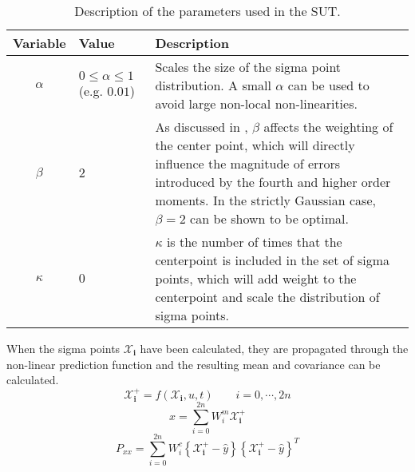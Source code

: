     \begin{table}
        \begin{tabularx}{\tablewidth}{c|p{2cm}X}
            \textbf{Variable} & \textbf{Value} & \textbf{Description} \\ \hline
            $\alpha$ & $0 \leq \alpha \leq 1$ (e.g. $0.01$) & Scales the size of the sigma point distribution.
                                                A small $\alpha$ can be used to avoid large non-local non-linearities. \\
            $\beta$  & $2$ &  As discussed in \citep{Julier02thescaled}, $\beta$ affects the weighting of the center point,
                            which will directly influence the magnitude of errors introduced by the fourth and higher
                            order moments. In the strictly Gaussian case, $\beta = 2$ can be shown to be optimal. \\
            $\kappa$ & $0$ &  $\kappa$ is the number of times that the centerpoint is included in the set of sigma points,
                            which will add weight to the centerpoint and scale the distribution of sigma points. \\
        \end{tabularx}
        \label{tbl:observer:ukf::parameters}
        \caption{Description of the parameters used in the SUT.}
    \end{table}

    When the sigma points $\mathbf{\mathcal{X}_{i}}$ have been calculated,
    they are propagated through the non-linear prediction function and
    the resulting mean and covariance can be calculated.
    \begin{equation}
        \mathbf{\mathcal{X}^{+}_{i}} = f(\mathbf{\mathcal{X}_{i}}, u, t) \qquad i = 0,\cdots,2n
    \end{equation}
    \begin{equation}
        \hat{x} = \sum_{i=0}^{2n}W^{m}_{i}\mathbf{\mathcal{X}^{+}_{i}}
    \end{equation}
    \begin{equation}
        P_{xx} = \sum_{i=0}^{2n}W^{c}_{i}
            \left\lbrace \mathbf{\mathcal{X}^{+}_{i}} - \hat{y} \right\rbrace
            \left\lbrace \mathbf{\mathcal{X}^{+}_{i}} - \hat{y} \right\rbrace^{T}
    \end{equation}

